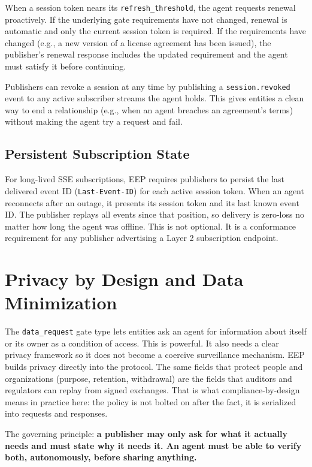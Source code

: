 \documentclass[12pt,a4paper]{article}
\begin{document}
When a session token nears its \texttt{refresh\_threshold}, the agent requests renewal proactively. If the underlying gate requirements have not changed, renewal is automatic and only the current session token is required. If the requirements have changed (e.g., a new version of a license agreement has been issued), the publisher's renewal response includes the updated requirement and the agent must satisfy it before continuing.

Publishers can revoke a session at any time by publishing a \texttt{session.revoked} event to any active subscriber streams the agent holds. This gives entities a clean way to end a relationship (e.g., when an agent breaches an agreement's terms) without making the agent try a request and fail.

\subsection{Persistent Subscription State}

For long-lived SSE subscriptions, EEP requires publishers to persist the last delivered event ID (\texttt{Last-Event-ID}) for each active session token. When an agent reconnects after an outage, it presents its session token and its last known event ID. The publisher replays all events since that position, so delivery is zero-loss no matter how long the agent was offline. This is not optional. It is a conformance requirement for any publisher advertising a Layer 2 subscription endpoint.

\section{Privacy by Design and Data Minimization}

The \texttt{data\_request} gate type lets entities ask an agent for information about itself or its owner as a condition of access. This is powerful. It also needs a clear privacy framework so it does not become a coercive surveillance mechanism. EEP builds privacy directly into the protocol. The same fields that protect people and organizations (purpose, retention, withdrawal) are the fields that auditors and regulators can replay from signed exchanges. That is what compliance-by-design means in practice here: the policy is not bolted on after the fact, it is serialized into requests and responses.

The governing principle: \textbf{a publisher may only ask for what it actually needs and must state why it needs it. An agent must be able to verify both, autonomously, before sharing anything.}
\end{document}
